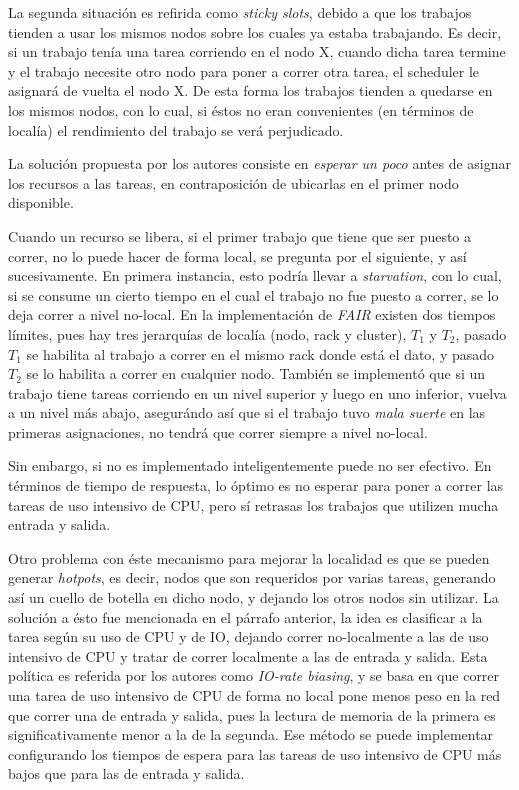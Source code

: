 \documentclass[a4paper]{article}
\begin{document}
La segunda situación es refirida como \textit{sticky slots}, debido a que los
trabajos tienden a usar los mismos nodos sobre los cuales ya estaba trabajando.
Es decir, si un trabajo tenía una tarea corriendo en el nodo X, cuando dicha
tarea termine y el trabajo necesite otro nodo para poner a correr otra tarea,
el scheduler le asignará de vuelta el nodo X. De esta forma los trabajos
tienden a quedarse en los mismos nodos, con lo cual, si éstos no eran
convenientes (en términos de localía) el rendimiento del trabajo se verá
perjudicado.

La solución propuesta por los autores consiste en \textit{esperar un poco}
antes de asignar los recursos a las tareas, en contraposición de ubicarlas en
el primer nodo disponible.

Cuando un recurso se libera, si el primer trabajo que tiene que ser puesto a
correr, no lo puede hacer de forma local, se pregunta por el siguiente, y así
sucesivamente. En primera instancia, esto podría llevar a \textit{starvation},
con lo cual, si se consume un cierto tiempo en el cual el trabajo no
fue puesto a correr, se lo deja correr a nivel no-local. En la implementación
de \textit{FAIR} existen dos tiempos límites, pues hay tres jerarquías de
localía (nodo, rack y cluster), $T_1$ y $T_2$, pasado $T_1$ se habilita al
trabajo a correr en el mismo rack donde está el dato, y pasado $T_2$ se lo
habilita a correr en cualquier nodo. También se implementó que si un trabajo
tiene tareas corriendo en un nivel superior y luego en uno inferior, vuelva a
un nivel más abajo, asegurándo así que si el trabajo tuvo \textit{mala suerte}
en las primeras asignaciones, no tendrá que correr siempre a nivel no-local.

Sin embargo, si no es implementado inteligentemente puede no ser efectivo. En
términos de tiempo de respuesta, lo óptimo es no esperar para poner a correr
las tareas de uso intensivo de CPU, pero sí retrasas los trabajos que utilizen
mucha entrada y salida.

Otro problema con éste mecanismo para mejorar la localidad es que se pueden
generar \textit{hotpots}, es decir, nodos que son requeridos por varias tareas,
generando así un cuello de botella en dicho nodo, y dejando los otros nodos
sin utilizar. La solución a ésto fue mencionada en el párrafo anterior, la idea
es clasificar a la tarea según su uso de CPU y de IO, dejando correr
no-localmente a las de uso intensivo de CPU y tratar de correr localmente a las
de entrada y salida. Esta política es referida por los autores como
\textit{IO-rate biasing}, y se basa en que correr una tarea de uso intensivo de
CPU de forma no local pone menos peso en la red que correr una de entrada y
salida, pues la lectura de memoria de la primera es significativamente menor a
la de la segunda. Ese método se puede implementar configurando los tiempos de
espera para las tareas de uso intensivo de CPU más bajos que para las de
entrada y salida.
\end{document}
